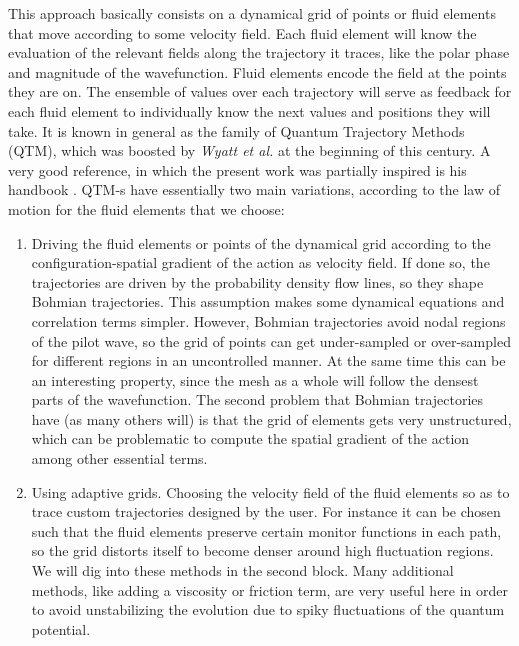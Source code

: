 \documentclass[11pt, a4paper]{article} %
\begin{document}
\begin{enumerate}
This approach basically consists on a dynamical grid of points or fluid elements that move according to some velocity field. Each fluid element will know the evaluation of the relevant fields along the trajectory it traces, like the polar phase and magnitude of the wavefunction. Fluid elements encode the field at the points they are on. The ensemble of values over each trajectory will serve as feedback for each fluid element to individually know the next values and positions they will take. It is known in general as the family of Quantum Trajectory Methods (QTM), which was boosted by {\em Wyatt et al.} at the beginning of this century. A very good reference, in which the present work was partially inspired is his handbook \cite{Wyatt}. QTM-s have essentially two main variations, according to the law of motion for the fluid elements that we choose:
\begin{enumerate}
\item Driving the fluid elements or points of the dynamical grid  according to the configuration-spatial gradient of the action as velocity field. If done so, the trajectories are driven by the probability density flow lines, so they shape Bohmian trajectories. This assumption makes some dynamical equations and correlation terms simpler. However, Bohmian trajectories avoid nodal regions of the pilot wave, so the grid of points can get under-sampled or over-sampled for different regions in an uncontrolled manner. At the same time this can be an interesting property, since the mesh as a whole will follow the densest parts of the wavefunction. The second problem that Bohmian trajectories have (as many others will) is that the grid of elements gets very unstructured, which can be problematic to compute the spatial gradient of the action among other essential terms.

\item Using adaptive grids. Choosing the velocity field of the fluid elements so as to trace custom trajectories designed by the user. For instance it can be chosen such that the fluid elements preserve certain monitor functions in each path, so the grid distorts itself to become denser around high fluctuation regions. We will dig into these methods in the second block. Many additional methods, like adding a viscosity or friction term, are very useful here in order to avoid unstabilizing the evolution due to spiky fluctuations of the quantum potential.
\end{enumerate}


\end{enumerate}
\end{document}
